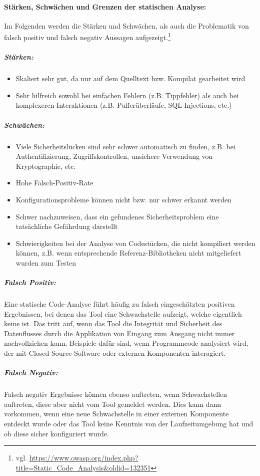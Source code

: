 \paragraph{Stärken, Schwächen und Grenzen der statischen Analyse:}
Im Folgenden werden die Stärken und Schwächen, als auch die Problematik von falsch positiv und falsch negativ Aussagen aufgezeigt.\footnote{vgl. \url{https://www.owasp.org/index.php?title=Static_Code_Analysis\&oldid=132351}}
\subparagraph{Stärken:}
\begin{itemize}
\item Skaliert sehr gut, da nur auf dem Quelltext bzw. Kompilat gearbeitet wird
\item Sehr hilfreich sowohl bei einfachen Fehlern (z.B. Tippfehler) als auch bei komplexeren Interaktionen (z.B. Pufferüberläufe, SQL-Injections, etc.)
\end{itemize}

\subparagraph{Schwächen:}
\begin{itemize}
\item Viele Sicherheitslücken sind sehr schwer automatisch zu finden, z.B. bei Authentifizierung, Zugriffskontrollen, unsichere Verwendung von Kryptographie, etc.
\item Hohe Falsch-Positiv-Rate
\item Konfigurationsprobleme können nicht bzw. nur schwer erkannt werden
\item Schwer nachzuweisen, dass ein gefundenes Sicherheitsproblem eine tatsächliche Gefährdung darstellt
\item Schwierigkeiten bei der Analyse von Codestücken, die nicht kompiliert werden können, z.B. wenn entsprechende Referenz-Bibliotheken nicht mitgeliefert wurden zum Testen
\end{itemize}

\subparagraph{Falsch Positiv:}
Eine statische Code-Analyse führt häufig zu falsch eingeschätzten positiven Ergebnissen, bei denen das Tool eine Schwachstelle aufzeigt, welche eigentlich keine ist. Das tritt auf, wenn das Tool die Integrität und Sicherheit des Datenflusses durch die Applikation von Eingang zum Ausgang nicht immer nachvollziehen kann. Beispiele dafür sind, wenn Programmcode analysiert wird, der mit Closed-Source-Software oder externen Komponenten interagiert.

\subparagraph{Falsch Negativ:}
Falsch negativ Ergebnisse können ebenso auftreten, wenn Schwachstellen auftreten, diese aber nicht vom Tool gemeldet werden. Dies kann dann vorkommen, wenn eine neue Schwachstelle in einer externen Komponente entdeckt wurde oder das Tool keine Kenntnis von der Laufzeitumgebung hat und ob diese sicher konfiguriert wurde.

